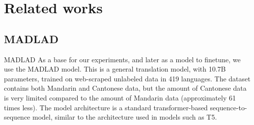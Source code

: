 \section{Related works}
\subsection{\textsc{MADLAD}}
\textsc{MADLAD}
As a base for our experiments, and later as a model to finetune, we use the \textsc{MADLAD} model. This is a general translation model, with 10.7B parameters, trained on web-scraped unlabeled data in 419 languages. The dataset contains both Mandarin and Cantonese data, but the amount of Cantonese data is very limited compared to the amount of Mandarin data (approximately 61 times less). The model architecture is a standard transformer-based sequence-to-sequence model, similar to the architecture used in models such as T5\cite{raffel2020exploringlimitstransferlearning}.